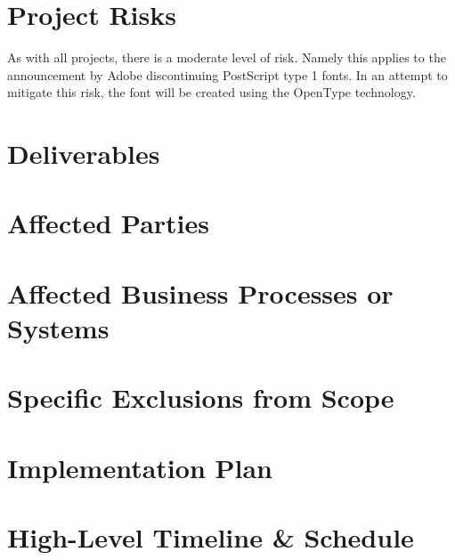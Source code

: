 \documentclass[a4paper]{article}
\begin{document}
\section{Project Risks}
As with all projects, there is a moderate level of risk. Namely this applies to the announcement by Adobe discontinuing PostScript type 1 fonts. In an attempt to mitigate this risk, the font will be created using the OpenType technology. 
\section{Deliverables} %

\section{Affected Parties} %

\section{Affected Business Processes or Systems} %

\section{Specific Exclusions from Scope} %

\section{Implementation Plan} %

\section{High-Level Timeline \& Schedule} %



\end{document}
